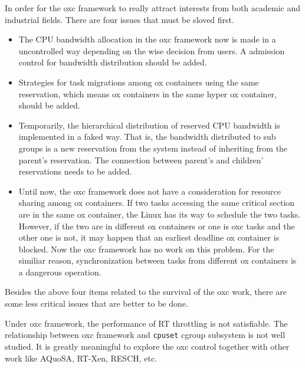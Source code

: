 In order for the oxc framework to really attract interests from both 
academic and industrial fields. There are four issues that must be 
sloved first.
\begin{itemize}
\item The CPU bandwidth allocation in the oxc framework now is made in 
a uncontrolled way depending on the wise decision from users. A admission
control for bandwidth distribution should be added.
\item Strategies for task migrations among ox containers using the same 
reservation, which means ox containers in the same hyper ox container,
should be added. 
\item Temporarily, the hierarchical distribution of reserved CPU bandwidth
is implemented in a faked way. That is, the bandwidth distributed to sub
groups is a new reservation from the system instead of inheriting from 
the parent's reservation. The connection between parent's and children' 
reservations needs to be added. 
\item Until now, the oxc framework does not have a consideration for 
resource sharing among ox containers. If two tasks accessing the same
critical section are in the same ox container, the Linux has its way
to schedule the two tasks. However, if the two are in different ox 
containers or one is oxc tasks and the other one is not, it may happen
that an earliest deadline ox container is blocked. Now the oxc framework 
has no work on this problem. For the similiar reason, synchronization
between tasks from different ox containers is a dangerous operation.
\end{itemize}
Besides the above four items related to the survival of the oxc work, 
there are some less critical issues that are better to be done.
 
Under oxc framework, the performance of RT throttling is not satisfiable.
The relationship between oxc framework and \texttt{cpuset} cgroup 
subsystem is not well studied. It is greatly meaningful to explore the
oxc control together with other work like AQuoSA, RT-Xen, RESCH, etc. 

